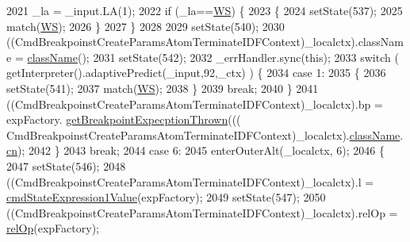 \begin{DoxyCode}
2021         \_la = \_input.LA(1);
2022         \textcolor{keywordflow}{if} (\_la==\hyperlink{classgov_1_1nasa_1_1jpf_1_1inspector_1_1server_1_1expression_1_1parser_1_1_expression_grammar_parser_ace44714ae633c7b14794cc5a24d9ebf3}{WS}) \{
2023           \{
2024           setState(537);
2025           match(\hyperlink{classgov_1_1nasa_1_1jpf_1_1inspector_1_1server_1_1expression_1_1parser_1_1_expression_grammar_parser_ace44714ae633c7b14794cc5a24d9ebf3}{WS});
2026           \}
2027         \}
2028 
2029         setState(540);
2030         ((CmdBreakpoinstCreateParamsAtomTerminateIDFContext)\_localctx).className = 
      \hyperlink{classgov_1_1nasa_1_1jpf_1_1inspector_1_1server_1_1expression_1_1parser_1_1_expression_grammar_parser_aafe03b251eef204ae911768faa5fd862}{className}();
2031         setState(542);
2032         \_errHandler.sync(\textcolor{keyword}{this});
2033         \textcolor{keywordflow}{switch} ( getInterpreter().adaptivePredict(\_input,92,\_ctx) ) \{
2034         \textcolor{keywordflow}{case} 1:
2035           \{
2036           setState(541);
2037           match(\hyperlink{classgov_1_1nasa_1_1jpf_1_1inspector_1_1server_1_1expression_1_1parser_1_1_expression_grammar_parser_ace44714ae633c7b14794cc5a24d9ebf3}{WS});
2038           \}
2039           \textcolor{keywordflow}{break};
2040         \}
2041          ((CmdBreakpoinstCreateParamsAtomTerminateIDFContext)\_localctx).bp =  expFactory.
      \hyperlink{classgov_1_1nasa_1_1jpf_1_1inspector_1_1server_1_1expression_1_1_expression_factory_a77487b13614f4e14543194d0c81ed038}{getBreakpointExpecptionThrown}(((
      CmdBreakpoinstCreateParamsAtomTerminateIDFContext)\_localctx).\hyperlink{classgov_1_1nasa_1_1jpf_1_1inspector_1_1server_1_1expression_1_1parser_1_1_expression_grammar_parser_aafe03b251eef204ae911768faa5fd862}{className}.\hyperlink{classgov_1_1nasa_1_1jpf_1_1inspector_1_1server_1_1expression_1_1parser_1_1_expression_grammar_parser_1_1_class_name_context_adfd3eff7fa59de106f32ddb5f19117e8}{cn}); 
2042         \}
2043         \textcolor{keywordflow}{break};
2044       \textcolor{keywordflow}{case} 6:
2045         enterOuterAlt(\_localctx, 6);
2046         \{
2047         setState(546);
2048         ((CmdBreakpoinstCreateParamsAtomTerminateIDFContext)\_localctx).l = 
      \hyperlink{classgov_1_1nasa_1_1jpf_1_1inspector_1_1server_1_1expression_1_1parser_1_1_expression_grammar_parser_a3251ad238ec49a426731c88fd13886b1}{cmdStateExpression1Value}(expFactory);
2049         setState(547);
2050         ((CmdBreakpoinstCreateParamsAtomTerminateIDFContext)\_localctx).relOp = 
      \hyperlink{classgov_1_1nasa_1_1jpf_1_1inspector_1_1server_1_1expression_1_1parser_1_1_expression_grammar_parser_af76d7c4bc312c622f71db248bbfd8f7e}{relOp}(expFactory);

\end{DoxyCode}
